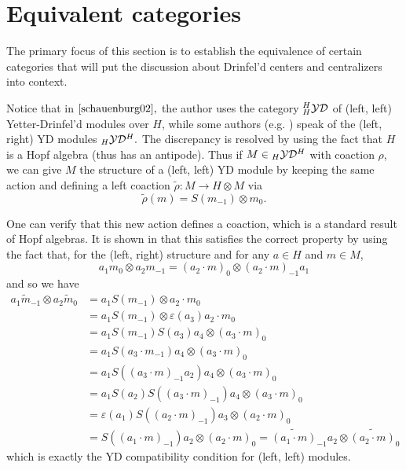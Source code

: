 \documentclass [11pt, proquest] {uwthesis}[2020/02/24]
\begin{document}
\section{Equivalent categories}
    The primary focus of this section is to establish the equivalence of certain categories that will put the discussion about Drinfel'd centers and centralizers into context. 
    \begin{rmk}
        Notice that in $\cite{schauenburg02},$ the author uses the category $^H_H\mathcal{Y}\mathcal{D}$ of (left, left) Yetter-Drinfel'd modules over $H$, while some authors (e.g. \cite{montgomery}) speak of the (left, right) YD modules $_H\mathcal{Y}\mathcal{D}^H.$ The discrepancy is resolved by using the fact that $H$ is a Hopf algebra (thus has an antipode). Thus if $M\in {_H\mathcal{Y}\mathcal{D}^H}$ with coaction $\rho$, we can give $M$ the structure of a (left, left) YD module by keeping the same action and defining a left coaction $\tilde\rho:M\to H\otimes M$ via
        \[\tilde\rho(m)= S(m_{-1})\otimes m_0.\]
        
        One can verify that this new action defines a coaction, which is a standard result of Hopf algebras. It is shown in \cite{radford-towber93} that this satisfies the correct property by using the fact that, for the (left, right) structure and for any $a\in H$ and $m\in M$,
        \[a_1m_0\otimes a_2m_{-1}=(a_2\cdot m)_0\otimes (a_2\cdot m)_{-1}a_1\]
        and so we have
        \begin{align*}
            a_1\tilde m_{-1}\otimes a_2 \tilde m_0&= a_1S(m_{-1})\otimes a_2\cdot m_0\\
            &=a_1S(m_{-1})\otimes \varepsilon(a_3)a_2\cdot m_0\\
            &=a_1S(m_{-1})S(a_3)a_4\otimes (a_3\cdot m)_0\\
            &=a_1S(a_3\cdot m_{-1})a_4\otimes (a_3\cdot m)_0\\
            &=a_1S((a_3\cdot m)_{-1}a_2)a_4\otimes (a_3\cdot m)_0\\
            &=a_1S(a_2)S((a_3\cdot m)_{-1})a_4\otimes (a_3\cdot m)_0\\
            &=\varepsilon(a_1)S((a_2\cdot m)_{-1})a_3\otimes (a_2\cdot m)_0\\
            &=S((a_1\cdot m)_{-1})a_2\otimes (a_2\cdot m)_0= \widetilde{(a_1\cdot m)}_{-1}a_2\otimes \widetilde{(a_2\cdot m)}_0
        \end{align*}
        which is exactly the YD compatibility condition for (left, left) modules.
    \end{rmk}
    
\end{document}
